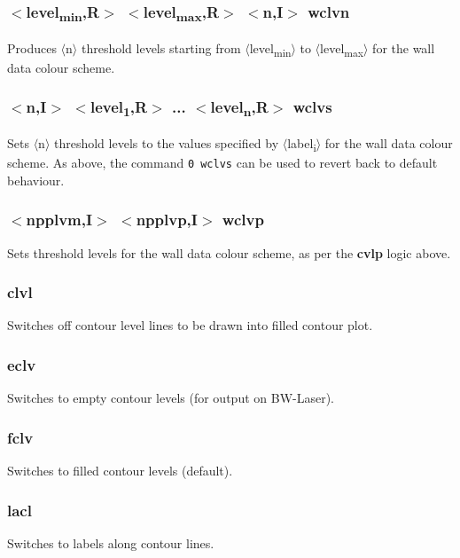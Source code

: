 \documentclass[a4paper,10pt]{report}
\begin{document}
\subsubsection{$<$level\textsubscript{min},{\bf R}$>$ $<$level\textsubscript{max},{\bf R}$>$ $<$n,{\bf I}$>$ wclvn}\label{sec:wclvn}
Produces $\langle$n$\rangle$ threshold levels starting from $\langle$level\textsubscript{min}$\rangle$ to $\langle$level\textsubscript{max}$\rangle$ for the wall data
colour scheme.

\subsubsection{$<$n,{\bf I}$>$ $<$level\textsubscript{1},{\bf R}$>$ ... $<$level\textsubscript{n},{\bf R}$>$ wclvs}\label{sec:wclvs}
Sets $\langle$n$\rangle$ threshold levels to the values specified by $\langle$label\textsubscript{i}$\rangle$ for the wall data colour scheme.
As above, the command {\tt 0 wclvs} can be used to revert back to default behaviour.

\subsubsection{$<$npplvm,{\bf I}$>$ $<$npplvp,{\bf I}$>$ wclvp}\label{sec:wclvp}
Sets threshold levels for the wall data colour scheme, as per the {\bf cvlp} logic above.

\subsubsection{clvl}\label{sec:clvl}
Switches off contour level lines to be drawn into filled contour plot.

\subsubsection{eclv}\label{sec:eclv}
Switches to empty contour levels (for output on BW-Laser).

\subsubsection{fclv}\label{sec:fclv}
Switches to filled contour levels (default).

\subsubsection{lacl}\label{sec:lacl}
Switches to labels along contour lines.
\end{document}
